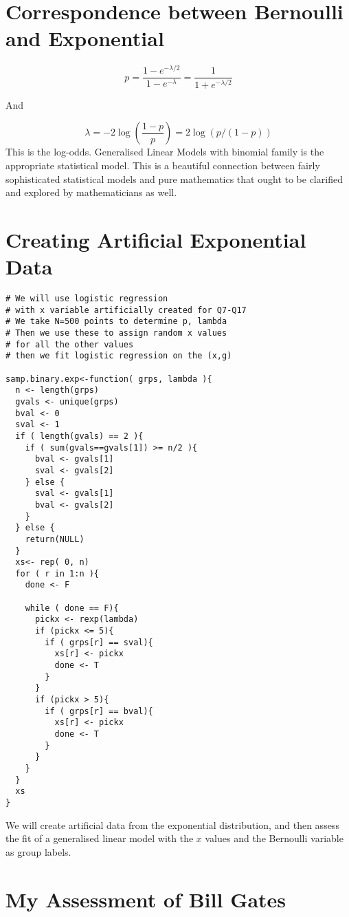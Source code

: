 \documentclass{amsart}
\begin{document}
\section{Correspondence between Bernoulli and Exponential}

\[
p = \frac{1-e^{-\lambda/2}}{1-e^{-\lambda}} = \frac{1}{1+e^{-\lambda/2}}
\]

And

\[
\lambda = - 2 \log\left( \frac{1-p}{p} \right) = 2 \log( p/(1-p))
\]
This is the log-odds.  Generalised Linear Models with binomial family is the appropriate statistical model.  This is a beautiful connection between fairly sophisticated statistical models and pure mathematics that ought to be clarified and explored by mathematicians as well.

\section{Creating Artificial Exponential Data}

\begin{verbatim}
# We will use logistic regression
# with x variable artificially created for Q7-Q17
# We take N=500 points to determine p, lambda
# Then we use these to assign random x values
# for all the other values
# then we fit logistic regression on the (x,g)

samp.binary.exp<-function( grps, lambda ){
  n <- length(grps)
  gvals <- unique(grps)
  bval <- 0
  sval <- 1
  if ( length(gvals) == 2 ){
    if ( sum(gvals==gvals[1]) >= n/2 ){
      bval <- gvals[1]
      sval <- gvals[2]
    } else {
      sval <- gvals[1]
      bval <- gvals[2]
    }
  } else {
    return(NULL)
  }
  xs<- rep( 0, n)
  for ( r in 1:n ){
    done <- F
    
    while ( done == F){
      pickx <- rexp(lambda)
      if (pickx <= 5){
        if ( grps[r] == sval){
          xs[r] <- pickx
          done <- T
        }  
      }
      if (pickx > 5){
        if ( grps[r] == bval){
          xs[r] <- pickx
          done <- T
        }  
      }
    }
  }
  xs
}
\end{verbatim}

We will create artificial data from the exponential distribution, and then assess the fit of a generalised linear model with the $x$ values and the Bernoulli variable as group labels.

\section{My Assessment of Bill Gates}
\end{document}
